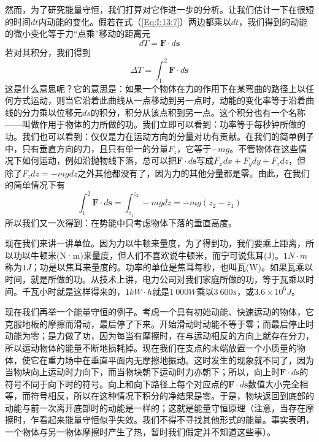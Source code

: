 然而，为了研究能量守恒，我们打算对它作进一步的分析。让我们估计一下在很短的时间$dt$内动能的变化。假若在式（\ref{Eq:I:13:7}）两边都乘以$dt$，我们得到的动能的微小变化等于力“点乘”移动的距离元
\begin{equation}
    \label{Eq:I:13:8}
    dT=\boldsymbol{F} \cdot d\boldsymbol{s}
\end{equation}
若对其积分，我们得到
\begin{equation}
    \label{Eq:I:13:9}
    \Delta T=\int_{1}^{2} \boldsymbol{F} \cdot d\boldsymbol{s}
\end{equation}
这是什么意思呢？它的意思是：如果一个物体在力的作用下在某弯曲的路径上以任何方式运动，则当它沿着此曲线从一点移动到另一点时，动能的变化率等于沿着曲线的分力乘以位移元$ds$的积分，积分从该点积到另一点。这个积分也有一个名称——叫做作用于物体的力所做的功。我们立即可以看到：功率等于每秒钟所做的功。我们也可以看到：仅仅是力在运动方向的分量对功有贡献。在我们的简单例子中，只有垂直方向的力，且只有单一的分量$F_z$，它等于$-mg$。不管物体在这些情况下如何运动，例如沿抛物线下落，总可以把$\boldsymbol{F} \cdot d\boldsymbol{s}$写成$F_xdx+F_ydy+F_zdz$，但除了$F_zdz=-mgdz$之外其他都没有了，因为力的其他分量都是零。由此，在我们的简单情况下有
\begin{equation}
    \label{Eq:I:13:10}
    \int_{1}^{2} \boldsymbol{F} \cdot d\boldsymbol{s}=\int_{z_1}^{z_2} -mgdz = -mg(z_2-z_1) 
\end{equation}
所以我们又一次得到：在势能中只考虑物体下落的垂直高度。

现在我们来讲一讲单位。因为力以牛顿来量度，为了得到功，我们要乘上距离，所以功以牛顿米(N·m)来量度，但人们不喜欢说牛顿米，而宁可说焦耳(J)。$1 N \cdot m$称为$1 J$；功是以焦耳来量度的。功率的单位是焦耳每秒，也叫瓦(W)。如果瓦乘以时间，就是所做的功。从技术上讲，电力公司对我们家庭所做的功，等于瓦乘以时间。千瓦小时就是这样得来的，$1 kW \cdot h$就是$1~000 W$乘以$3~600 s$，或$3.6 \times 10^6J$。

现在我们再举一个能量守恒的例子。考虑一个具有初始动能、快速运动的物体，它克服地板的摩擦而滑动，最后停了下来。开始滑动时动能不等于零；而最后停止时动能为零；是力做了功，因为每当有摩擦时，在与运动相反的方向上就存在分力，所以运动物体的能量不断地损耗掉。现在我们在支点的末端放置一个小质量的物体，使它在重力场中在垂直平面内无摩擦地振动。这时发生的现象就不同了，因为当物块向上运动时力向下，而当物块朝下运动时力亦朝下；所以，向上时$\boldsymbol{F} \cdot d\boldsymbol{s}$的符号不同于向下时的符号。向上和向下路径上每个对应点的$\boldsymbol{F} \cdot d\boldsymbol{s}$数值大小完全相等，而符号相反，所以在这种情况下积分的净结果是零。于是，物块返回到底部的动能与前一次离开底部时的动能是一样的；这就是能量守恒原理（注意，当存在摩擦时，乍看起来能量守恒似乎失效。我们不得不寻找其他形式的能量。事实表明，一个物体与另一物体摩擦时产生了热，暂时我们假定并不知道这些事）。

